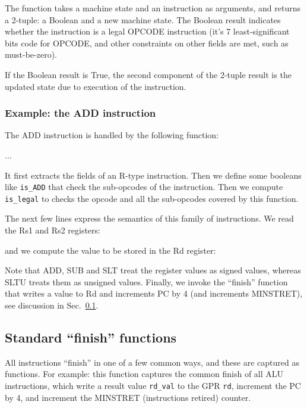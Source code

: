 \documentclass[11pt]{article}
\begin{document}
The function takes a machine state and an instruction as arguments,
and returns a 2-tuple: a Boolean and a new machine state.  The Boolean
result indicates whether the instruction is a legal OPCODE instruction
(it's 7 least-significant bits code for OPCODE, and other constraints
on other fields are met, such as must-be-zero).

If the Boolean result is True, the second component of the 2-tuple
result is the updated state due to execution of the instruction.

\subsubsection{Example: the ADD instruction}

The ADD instruction is handled by the following function:


...


It first extracts the fields of an R-type instruction.  Then we define
some booleans like \verb|is_ADD| that check the sub-opcodes of the
instruction.  Then we compute \verb|is_legal| to checks the opcode and
all the sub-opcodes covered by this function.

The next few lines express the semantics of this family of
instructions.  We read the Rs1 and Rs2 registers:



and we compute the value to be stored in the Rd register:



Note that ADD, SUB and SLT treat the register values as signed values,
whereas SLTU treats them as unsigned values. Finally, we invoke the
``finish'' function that writes a value to Rd and increments PC by 4
(and increments MINSTRET), see discussion in
Sec.~\ref{sec_standard_finish_functions}.






\subsection{Standard ``finish'' functions}

\label{sec_standard_finish_functions}

All instructions ``finish'' in one of a few common ways, and these are
captured as functions.  For example: this function captures the common
finish of all ALU instructions, which write a result value
\verb|rd_val| to the GPR \verb|rd|, increment the PC by 4, and
increment the MINSTRET (instructions retired) counter.
\end{document}
